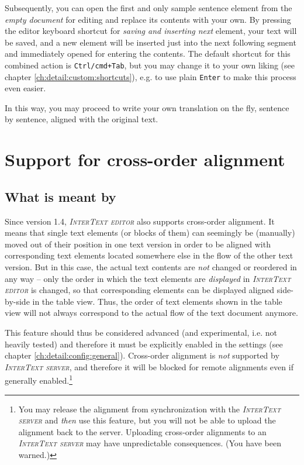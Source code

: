 \documentclass[a4paper,10pt,oneside]{book}
\newcommand{\ITeditor}{\textit{\textsc{InterText editor}}\xspace}
\newcommand{\ITserver}{\textit{\textsc{InterText server}}\xspace}
\newcommand{\keys}[1]{\texttt{#1}}
\begin{document}

Subsequently, you can open the first and only sample sentence element from the \emph{empty document} for editing and replace its contents with your own. By pressing the editor keyboard shortcut for \emph{saving and inserting next} element, your text will be saved, and a new element will be inserted just into the next following segment and immediately opened for entering the contents. The default shortcut for this combined action is \keys{Ctrl/cmd+Tab}, but you may change it to your own liking (see chapter \ref{ch:detail:custom:shortcuts}), e.g. to use plain \keys{Enter} to make this process even easier.

In this way, you may proceed to write your own translation on the fly, sentence by sentence, aligned with the original text.

\chapter{Support for cross-order alignment}\label{ch:detail:crossorder}

\section{What is meant by }\label{ch:detail:crossorder:wtf}

Since version 1.4, \ITeditor also supports cross-order alignment. It means that single text elements (or blocks of them) can seemingly be (manually) moved out of their position in one text version in order to be aligned with corresponding text elements located somewhere else in the flow of the other text version. But in this case, the actual text contents are \emph{not} changed or reordered in any way -- only the order in which the text elements are \emph{displayed} in \ITeditor is changed, so that corresponding elements can be displayed aligned side-by-side in the table view. Thus, the order of text elements shown in the table view will not always correspond to the actual flow of the text document anymore.

This feature should thus be considered advanced (and experimental, i.e. not heavily tested) and therefore it must be explicitly enabled in the settings (see chapter \ref{ch:detail:config:general}). Cross-order alignment is \emph{not} supported by \ITserver, and therefore it will be blocked for remote alignments even if generally enabled.\footnote{You may release the alignment from synchronization with the \ITserver and \emph{then} use this feature, but you will not be able to upload the alignment back to the server. Uploading cross-order alignments to an \ITserver may have unpredictable consequences. (You have been warned.)}
\end{document}
